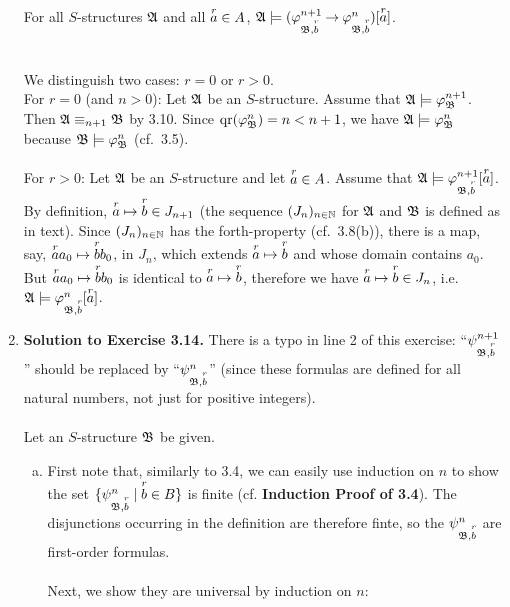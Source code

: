 \begin{enumerate}[1.]
\centerline{For all $S$-structures $\struct{A}$ and all $\vect{a}{r} \in A$, $\struct{A} \models (\varphi^{n + 1}_{\struct{B}, \vect{b}{r}} \limply \varphi^n_{\struct{B}, \vect{b}{r}})[\vect{a}{r}]$.}\\
We distinguish two cases: $r = 0$ or $r > 0$.\medskip\\
For $r = 0$ (and $n > 0$): Let $\struct{A}$ be an $S$-structure. Assume that $\struct{A} \models \varphi^{n + 1}_\struct{B}$. Then $\struct{A} \equiv_{n + 1} \struct{B}$ by 3.10. Since $\qr{\varphi^n_\struct{B}} = n < n + 1$, we have $\struct{A} \models \varphi^n_\struct{B}$ because $\struct{B} \models \varphi^n_\struct{B}$ (cf.\ 3.5).\\
\ \\
For $r > 0$: Let $\struct{A}$ be an $S$-structure and let $\vect{a}{r} \in A$. Assume that $\struct{A} \models \varphi^{n + 1}_{\struct{B}, \vect{b}{r}}[\vect{a}{r}]$. By definition, $\vect{a}{r} \mapsto \vect{b}{r} \in J_{n + 1}$ (the sequence $(J_n)_{n \in \nat}$ for $\struct{A}$ and $\struct{B}$ is defined as in text). Since $(J_n)_{n \in \nat}$ has the forth-property (cf.\ 3.8(b)), there is a map, say, $\vect{a}{r}a_0 \mapsto \vect{b}{r}b_0$, in $J_n$, which extends $\vect{a}{r} \mapsto \vect{b}{r}$ and whose domain contains $a_0$. But $\vect{a}{r}a_0 \mapsto \vect{b}{r}b_0$ is identical to $\vect{a}{r} \mapsto \vect{b}{r}$, therefore we have $\vect{a}{r} \mapsto \vect{b}{r} \in J_n$, i.e.\ $\struct{A} \models \varphi^n_{\struct{B}, \vect{b}{r}}[\vect{a}{r}]$.
%
\item \textbf{Solution to Exercise 3.14.} There is a typo in line 2 of this exercise: ``$\psi^{n + 1}_{\struct{B}, \vect{b}{r}}$'' should be replaced by ``$\psi^n_{\struct{B}, \vect{b}{r}}$'' (since these formulas are defined for all natural numbers, not just for positive integers).\\
\ \\
Let an $S$-structure $\struct{B}$ be given.
\begin{enumerate}[(a)]
\item First note that, similarly to 3.4, we can easily use induction on $n$ to show the set $\setm{\psi^n_{\struct{B}, \vect{b}{r}}}{\vect{b}{r} \in B}$
is finite (cf. \textbf{Induction Proof of 3.4}). The disjunctions occurring in the definition are therefore finte, so the $\psi^n_{\struct{B}, \vect{b}{r}}$ are first-order formulas.\\
\ \\
Next, we show they are universal by induction on $n$:\smallskip\\

\end{enumerate}
\end{enumerate}
